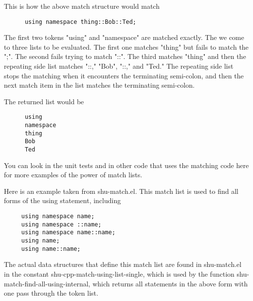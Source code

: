 This is how the above match structure would match

\small{\begin{verbatim}
      using namespace thing::Bob::Ted;
\end{verbatim}}

The first two tokens "using" and "namespace" are matched exactly.  The we
come to three lists to be evaluated.  The first one matches "thing" but fails
to match the ";".  The second fails trying to match "::".  The third matches
"thing" and then the repeating side list matches "::," "Bob", "::," and
"Ted."  The repeating side list stops the matching when it encounters the
terminating semi-colon, and then the next match item in the list matches the
terminating semi-colon.

The returned list would be

\small{\begin{verbatim}
      using
      namespace
      thing
      Bob
      Ted
\end{verbatim}}

You can look in the unit tests and in other code that uses the matching code
here for more examples of the power of match lists.



Here is an example taken from shu-match.el.  This match list is used to find
all forms of the using statement, including

\small{\begin{verbatim}
     using namespace name;
     using namespace ::name;
     using namespace name::name;
     using name;
     using name::name;
\end{verbatim}}

The actual data structures that define this match list are found in
shu-match.el in the constant shu-cpp-match-using-list-single, which is used by
the function shu-match-find-all-using-internal, which returns all statements
in the above form with one pass through the token list.






